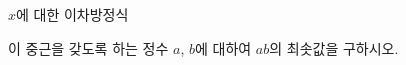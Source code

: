 $x$에 대한 이차방정식 \par\smallskip{}\par\smallskip\noindent 이 중근을 갖도록 하는 정수 $a$, $b$에 대하여 $ab$의 최솟값을 구하시오.
